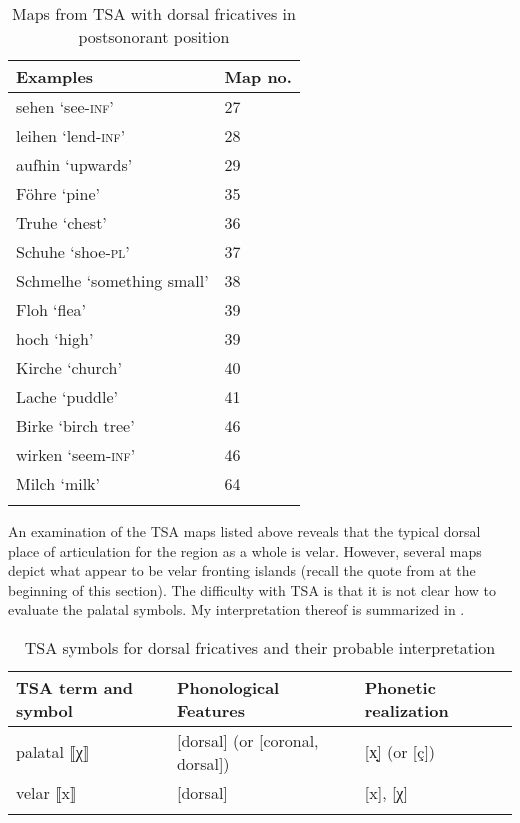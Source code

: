 \begin{table}
\caption{Maps from TSA with dorsal fricatives in postsonorant position\label{tab:15.5}}
\begin{tabular}{ll}
\lsptoprule
Examples & Map no.\\\midrule
sehen ‘see-\textsc{inf}’ & 27\\
leihen ‘lend-\textsc{inf}’ & 28\\
aufhin ‘upwards’ & 29\\
Föhre ‘pine’ & 35\\
Truhe ‘chest’ & 36\\
Schuhe ‘shoe-\textsc{pl}’ & 37\\
Schmelhe ‘something small’ & 38\\
Floh ‘flea’& 39\\
hoch ‘high’ & 39\\
Kirche ‘church’ & 40\\
Lache ‘puddle’ & 41\\
Birke ‘birch tree’ & 46\\
wirken ‘seem\textsc{{}-inf}’ & 46\\
Milch ‘milk’ & 64\\
\lspbottomrule
\end{tabular}
\end{table}

An examination of the TSA maps listed above reveals that the typical dorsal place of articulation for the region as a whole is velar. However, several maps depict what appear to be velar fronting islands (recall the quote from \citealt{Schatz1903} at the beginning of this section). The difficulty with TSA is that it is not clear how to evaluate the palatal symbols. My interpretation thereof is summarized  in .

\begin{table}
\caption{\label{tab:15.6}TSA symbols for dorsal fricatives and their probable interpretation}
\begin{tabular}{lll}
\lsptoprule
TSA term and symbol & Phonological Features & Phonetic realization\\\midrule
palatal ⟦χ⟧ & [dorsal] (or [coronal, dorsal]) & [x̟] (or [ç])\\
velar ⟦x⟧ & [dorsal] & [x], [χ]\\
\lspbottomrule
\end{tabular}
\end{table}

